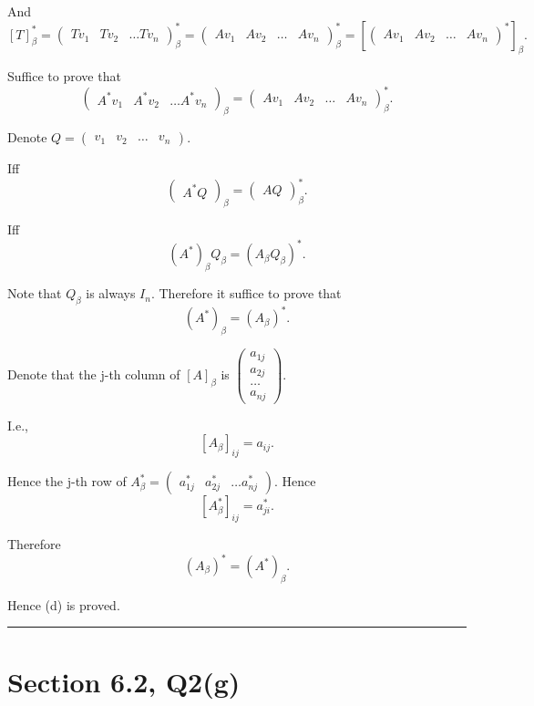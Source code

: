 \documentclass[12pt]{article}%
\begin{document}
And $$[T]_{\beta}^{*}=\begin{pmatrix} Tv_1 & Tv_2&\dots Tv_n \end{pmatrix}_\beta^{*}
=\begin{pmatrix} Av_1& Av_2&\dots &Av_n \end{pmatrix}_\beta^*=[\begin{pmatrix} Av_1& Av_2&\dots &Av_n \end{pmatrix}^*]_\beta.$$

Suffice to prove that $$\begin{pmatrix} A^{*}v_1 &A^{*}v_2&\dots A^{*}v_n \end{pmatrix}_\beta=\begin{pmatrix} Av_1& Av_2&\dots &Av_n \end{pmatrix}_\beta^*.$$

Denote $Q=\begin{pmatrix}v_1&v_2&\dots&v_n\end{pmatrix}.$

Iff $$\begin{pmatrix} A^{*}Q\end{pmatrix}_\beta=\begin{pmatrix}AQ\end{pmatrix}_\beta^{*}.$$

Iff $$(A^{*})_\beta Q_\beta=(A_\beta Q_\beta)^*.$$

Note that $Q_\beta$ is always $I_n$. Therefore it suffice to prove that $$(A^*)_\beta=(A_\beta)^*.$$

Denote that the j-th column of $[A]_\beta$ is $\begin{pmatrix} a_{1j}\\a_{2j}\\\dots\\a_{nj} \end{pmatrix}$.

I.e., $$[A_\beta]_{ij}=a_{ij}.$$

Hence the j-th row of $A^{*}_\beta=\begin{pmatrix}a_{1j}^{*} & a_{2j}^{*} & \dots a_{nj}^{*} \end{pmatrix}.$ Hence $$[A_\beta^{*}]_{ij}=a_{ji}^{*}.$$

Therefore $$(A_\beta)^*=(A^*)_\beta.$$

Hence (d) is proved.

\noindent\rule[0.1ex]{\linewidth}{1pt}

\section{Section 6.2, Q2(g)}
\end{document}
